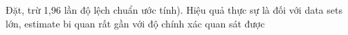 Đặt, trừ 1,96 lần độ lệch chuẩn ước tính). Hiệu quả thực sự là đối với data sets lớn, estimate bi quan rất gần với độ chính xác quan sát được


